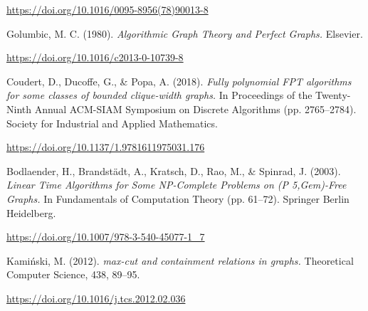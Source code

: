 \begin{thebibliography}{99}
    \url{https://doi.org/10.1016/0095-8956(78)90013-8}

     Golumbic, M. C. (1980).
    \textit{Algorithmic Graph Theory and Perfect Graphs.}
    Elsevier.

    \url{https://doi.org/10.1016/c2013-0-10739-8}

     Coudert, D., Ducoffe, G., \& Popa, A. (2018).
    \textit{Fully polynomial FPT algorithms for some classes of bounded clique-width graphs.}
    In Proceedings of the Twenty-Ninth Annual ACM-SIAM Symposium on Discrete Algorithms (pp. 2765–2784). Society for Industrial and Applied Mathematics.

    \url{https://doi.org/10.1137/1.9781611975031.176}

     Bodlaender, H., Brandstädt, A., Kratsch, D., Rao, M., \& Spinrad, J. (2003).
    \textit{Linear Time Algorithms for Some NP-Complete Problems on (P 5,Gem)-Free Graphs.}
    In Fundamentals of Computation Theory (pp. 61–72). Springer Berlin Heidelberg.

    \url{https://doi.org/10.1007/978-3-540-45077-1_7}

     Kamiński, M. (2012).
    \textit{max-cut and containment relations in graphs.}
    Theoretical Computer Science, 438, 89–95.

    \url{https://doi.org/10.1016/j.tcs.2012.02.036}

\end{thebibliography}
